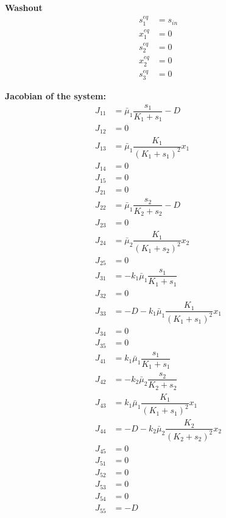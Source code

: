 \documentclass[]{report}
\begin{document}
\textbf{Washout}
\begin{align}
s_1^{eq} &= s_{in} \\
x_1^{eq} &= 0 \\
s_2^{eq} &= 0 \\
x_2^{eq} &=0 \\
s_3^{eq} &= 0 
\end{align}

\textbf{Jacobian of the system:}
\begin{align}
J_{11} & = \bar{\mu}_1 \dfrac{s_1}{K_1 + s_1} -D \\
J_{12} & = 0 \\
J_{13} & = \bar{\mu}_1 \dfrac{K_1}{(K_1 + s_1)^2}x_1 \\
J_{14} & = 0 \\
J_{15} & = 0 \\
J_{21} & = 0 \\
J_{22} & = \bar{\mu}_1 \dfrac{s_2}{K_2 + s_2} -D \\
J_{23} & = 0 \\
J_{24} & = \bar{\mu}_2 \dfrac{K_1}{(K_1 + s_2)^2}x_2  \\
J_{25} & = 0 \\
J_{31} & = -k_1\bar{\mu}_1 \dfrac{s_1}{K_1 + s_1} \\
J_{32} & = 0 \\
J_{33} & = -D -k_1\bar{\mu}_1 \dfrac{K_1}{(K_1 + s_1)^2}x_1 \\
J_{34} & = 0 \\
J_{35} & = 0 \\
J_{41} & = k_1\bar{\mu}_1 \dfrac{s_1}{K_1 + s_1} \\
J_{42} & = -k_2\bar{\mu}_2 \dfrac{s_2}{K_2 + s_2} \\
J_{43} & = k_1  \bar{\mu}_1 \dfrac{K_1}{(K_1 + s_1)^2}x_1 \\
J_{44} & = -D-k_2 \bar{\mu}_2 \dfrac{K_2}{(K_2 + s_2)^2}x_2 \\
J_{45} & = 0 \\
J_{51} & = 0 \\
J_{52} & = 0 \\
J_{53} & = 0 \\
J_{54} & = 0 \\
J_{55} & = -D \\
\end{align}
\end{document}
